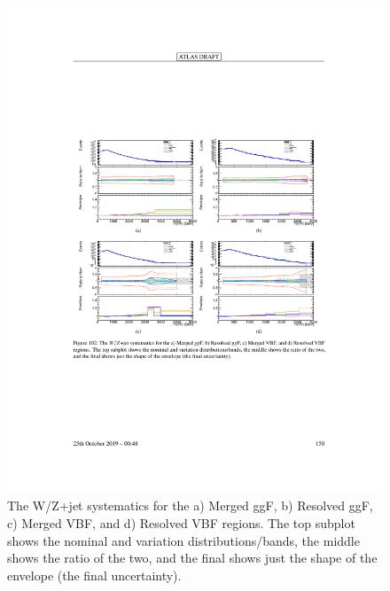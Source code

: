 \begin{figure}[h!]
  \centering
  \includegraphics[width=\hsize]{figures/Analysis/modelingsysts/w_syst.pdf}
      \caption{The W/Z+jet systematics for the a) Merged ggF, b) Resolved ggF, c) Merged VBF, and d) Resolved VBF regions. The top subplot shows the nominal and variation distributions/bands, the middle shows the ratio of the two, and the final shows just the shape of the envelope (the final uncertainty).} 
  \label{fig:w_systs}
\end{figure} 
\FloatBarrier


